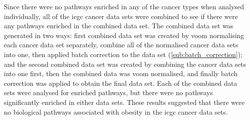 Since there were no pathways enriched in any of the cancer types when analysed individually, all of the \gls{icgc} cancer data sets were combined to see if there were any pathways enriched in the combined data set.
The combined data set was generated in two ways: first combined data set was created by voom normalising each cancer data set separately, combine all of the normalised cancer data sets into one, then applied batch correction to the data set (\cref{sub:batch_correction}); and the second combined data set was created by combining the cancer data sets into one first, then the combined data was voom normalised, and finally batch correction was applied to obtain the final data set.
Each of the combined data sets were analysed for enriched pathways, but there were no pathways significantly enriched in either data sets.
These results suggested that there were no biological pathways associated with obesity in the \gls{icgc} cancer data sets.

